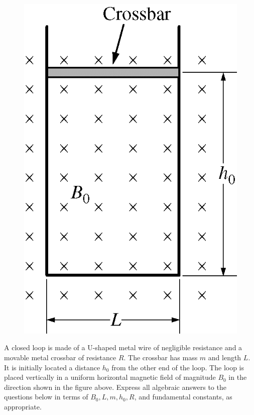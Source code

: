 %

\begin{figure}[H]
\centering
\includegraphics[scale=0.3]{images/img-018-033.png}
\end{figure}


\question
A closed loop is made of a U-shaped metal wire of negligible resistance and a movable metal crossbar of resistance $R$. The crossbar has mass $m$ and length $L$. It is initially located a distance $h_{0}$ from the other end of the loop. The loop is placed vertically in a uniform horizontal magnetic field of magnitude $B_{0}$ in the direction shown in the figure above. Express all algebraic answers to the questions below in terms of $B_{0}, L, m, h_{0}, R$, and fundamental constants, as appropriate. %

